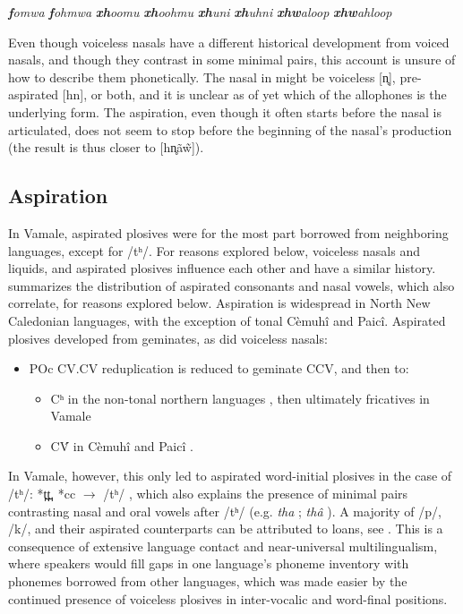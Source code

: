 	\ea  \parencite[27]{rivierre_bwatoo_2006}
		\ea \textit{\textbf{f}omwa} \goodtilde \textit{\textbf{f}ohmwa} 
		\ex \textit{\textbf{xh}oomu} \goodtilde \textit{\textbf{xh}oohmu} 
		\ex \textit{\textbf{xh}uni} \goodtilde \textit{\textbf{xh}uhni} 
		\ex \textit{\textbf{xhw}aloop} \goodtilde \textit{\textbf{xhw}ahloop} 
		\z
	\z
		
	Even though voiceless nasals have a different historical development from voiced nasals, and though they contrast in some minimal pairs, this account is unsure of how to describe them phonetically. The nasal in  might be voiceless [n̥], pre-aspirated [hn], or both, and it is unclear as of yet which of the allophones is the underlying form. The aspiration, even though it often starts before the nasal is articulated, does not seem to stop before the beginning of the nasal's production (the result is thus closer to [hn̥ãw̃]).
	
	\subsection{Aspiration} \label{ssec:Aspiration}

In Vamale, aspirated plosives were for the most part borrowed from neighboring languages, except for /tʰ/. For reasons explored below, voiceless nasals and liquids, and aspirated plosives influence each other and have a similar history.  summarizes the distribution of aspirated consonants and nasal vowels, which also correlate, for reasons explored below.
Aspiration is widespread in North New Caledonian languages, with the exception of tonal Cèmuhî and Paicî. Aspirated plosives developed from geminates, as did voiceless nasals:
\begin{itemize}
\item POc CV.CV reduplication is reduced to geminate CCV, and then to: \begin{itemize}
	\item Cʰ in the non-tonal northern languages \parencite[27]{ozanne-rivierre_phonologie_1982}, then ultimately fricatives in Vamale
	\item CV́ in Cèmuhî and Paicî \parencite[203]{ozanne-rivierre_proto-oceanic_1992}.
\end{itemize}
\end{itemize}

In Vamale, however, this only led to aspirated word-initial plosives in the case of /tʰ/: *t̪t̪, *cc $\rightarrow$ /tʰ/ \parencite[513]{rivierre_contact_1994}, which also explains the presence of minimal pairs contrasting nasal and oral vowels after /tʰ/ (e.g. \textit{tha} ; \textit{thâ} ). A majority of /p/, /k/, and their aspirated counterparts can be attributed to loans, see  \parencite[516]{rivierre_contact_1994}. This is a consequence of extensive language contact and near-universal multilingualism, where speakers would fill gaps in one language's phoneme inventory with phonemes borrowed from other languages, which was made easier by the continued presence of voiceless plosives in inter-vocalic and word-final positions.

